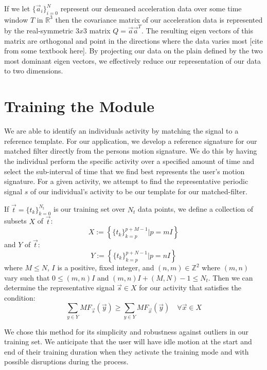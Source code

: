 \documentclass[journal]{IEEEtran}
\begin{document}
If we let $\{\vec{a}_i\}_{i=0}^{N}$ represent our demeaned acceleration data over some time window $T$ in $\mathbb{R}^3$ then the covariance matrix of our acceleration data is represented by the real-symmetric $3x3$ matrix $Q = \vec{a} \vec{a}^T$.
The resulting eigen vectors of this matrix are orthogonal and point in the directions where the data varies most [cite from some textbook here].
By projecting our data on the plain defined by the two most dominant eigen vectors, we effectively reduce our representation of our data to two dimensions.
%
\section{Training the Module}
We are able to identify an individual\textquotesingle s activity by matching the signal to a reference template.
For our application, we develop a reference signature for our matched filter directly from the person\textquotesingle s motion signature.
We do this by having the individual perform the specific activity over a specified amount of time and select the sub-interval of time that we find best represents the user's motion signature.
For a given activity, we attempt to find the representative periodic signal $s$ of our individual’s activity to be our template for our matched-filter.

If $\vec{t} = \{t_k\}_{k=0}^{N_t}$ is our training set over $N_t$ data points, we define a collection of subsets $X$ of $\vec{t}$:
%
\begin{equation} \label{X_subsets_of_training_eq}
X := \left \{ \{t_k\}_{k=p}^{p+M-1} | p=mI \right \}
\end{equation}
%
and $Y$ of $\vec{t}$:
%
\begin{equation} \label{Y_subsets_of_training_eq}
Y := \left \{ \{t_k\}_{k=p}^{p+N-1} | p=nI \right \}
\end{equation}
%
where $M \leq N$, $I$ is a positive, fixed integer, and $(n,m) \in \mathbb{Z}^2$ where $(m,n)$ vary such that $0 \leq (m,n)I$ and $(m,n)I + (M,N) - 1 \leq N_t$. Then we can determine the representative signal $\vec{s} \in X$ for our activity that satisfies the condition:
%
\begin{equation} \label{s_condition}
\sum_{y \in Y}MF_{\vec{s}}(\vec{y}) \geq \sum_{y \in Y}MF_{\vec{x}}(\vec{y}) \quad \forall \vec{x} \in X
\end{equation}

We chose this method for its simplicity and robustness against outliers in our training set. We anticipate that the user will have idle motion at the start and end of their training duration when they activate the training mode and with possible disruptions during the process.
%
\end{document}
